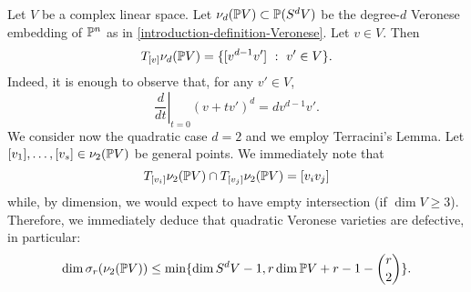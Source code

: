 \begin{example}
\label{geometrySecants-lemma-quadratic_Veronese_defective}
    Let $V$ be a complex linear space. Let $\nu_d(\mathbb{P} V) \subset \mathbb{P}(S^d V)$ be the degree-$d$ Veronese embedding of $\mathbb{P}^n$ as in \ref{introduction-definition-Veronese}. Let $v \in V$. Then
    \[
        T_{[v]}\nu_d(\mathbb{P} V) = \{[v^{d-1}v'] ~:~ v' \in V\}. 
    \]
    Indeed, it is enough to observe that, for any $v' \in V$,
    \[
        \left.\frac{d}{dt}\right|_{t = 0}(v+tv')^{d} = dv^{d-1}v'.
    \]
    We consider now the quadratic case $d = 2$ and we employ Terracini's Lemma. Let $[v_1],\ldots,[v_s] \in \nu_2(\mathbb{P} V)$ be general points. We immediately note that 
    \[
        T_{[v_i]}\nu_2(\mathbb{P} V) \cap T_{[v_j]}\nu_2(\mathbb{P} V) = [v_iv_j]
    \]
    while, by dimension, we would expect to have empty intersection (if $\dim V \geq 3$). Therefore, we immediately deduce that quadratic Veronese varieties are defective, in particular:
    \[
        \dim \sigma_r(\nu_2(\mathbb{P} V)) \leq \min \{\dim S^dV - 1, r\dim \mathbb{P} V + r - 1 - {r \choose 2}\}.  
    \]
\end{example}
